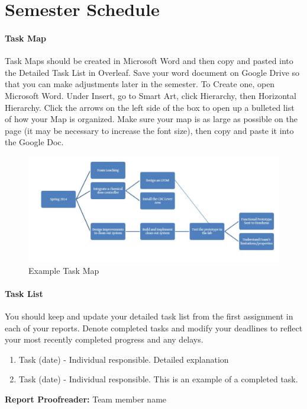 \documentclass[a4paper]{article}
\begin{document}



\clearpage

\part*{Semester Schedule}

\subsection*{Task Map}
Task Maps should be created in Microsoft Word and then copy and pasted into the Detailed Task List in Overleaf. Save your word document on Google Drive so that you can make adjustments later in the semester.
To Create one, open Microsoft Word. Under Insert, go to Smart Art, click Hierarchy, then Horizontal Hierarchy.  Click the arrows on the left side of the box to open up a bulleted list of how your Map is organized. Make sure your map is as large as possible on the page (it may be necessary to increase the font size), then copy and paste it into the Google Doc.

\begin{figure}[H]
\centering
\includegraphics[scale=0.5]{ExampleTaskMap}
\caption{Example Task Map}
\label{ExampleTaskMap}
\end{figure}

\subsection*{Task List}
 You should keep and update your detailed task list from the first assignment in each of your reports. Denote completed tasks and modify your deadlines to reflect your most recently completed progress and any delays.

\begin{enumerate}
\item Task (date) - Individual responsible. Detailed explanation
\item \checkmark Task (date) - Individual responsible. This is an example of a completed task.

\end{enumerate}
\textbf{Report Proofreader: }Team member name
\end{document}
